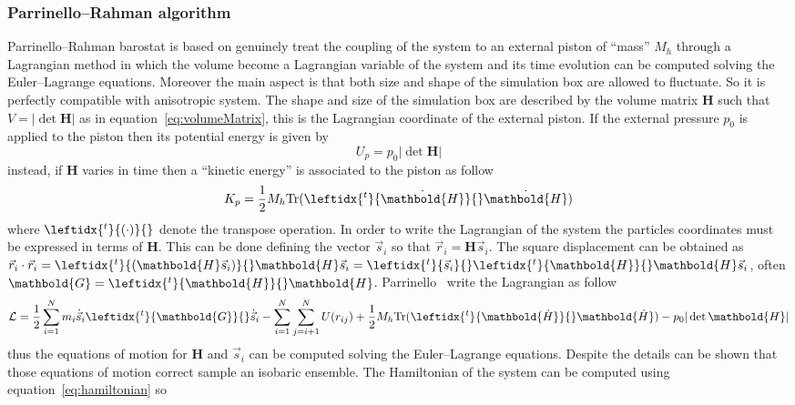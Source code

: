 \subsubsection{Parrinello--Rahman algorithm}
Parrinello--Rahman barostat \cite{ParrinelloBarostat1}\cite{ParrinelloBarostat2} is based on genuinely treat the coupling of the system to an external piston of ``mass'' $M_h$ through a Lagrangian method in which the volume become a Lagrangian variable of the system and its time evolution can be computed solving the Euler--Lagrange equations. Moreover the main aspect is that both size and shape of the simulation box are allowed to fluctuate. So it is perfectly compatible with anisotropic system. The shape and size of the simulation box are described by the volume matrix $ \mathbold{H}$ such that $V = |\det\mathbold{H}|$ as in equation~\eqref{eq:volumeMatrix}, this is the Lagrangian coordinate of the external piston. If the external pressure $p_0$ is applied to the piston then its potential energy is given by
\begin{equation*}
	U_p = p_0 |\det  \mathbold{H}|
\end{equation*}
instead, if $ \mathbold{H}$ varies in time then a ``kinetic energy'' is associated to the piston as follow
\begin{equation*}
	K_p = \frac{1}{2}M_h \text{Tr}(\leftidx{^t}{\dot{ \mathbold{H}}}{} \dot{ \mathbold{H}} )
\end{equation*}
where $\leftidx{^t}{(\cdot)}{}$ denote the transpose operation. In order to write the Lagrangian of the system the particles coordinates must be expressed in terms of $ \mathbold{H}$. This can be done defining the vector $\vec s_i$ so that $\vec r_i =  \mathbold{H} \vec s_i$. The square displacement can be obtained as $\vec r_i \cdot \vec r_i = \leftidx{^t}{ (\mathbold{H} \vec s_i)}{}  \mathbold{H} \vec s_i = \leftidx{^t}{\vec s_i}{} \leftidx{^t}{ \mathbold{H}}{}  \mathbold{H} \vec s_i$, often $ \mathbold{G} = \leftidx{^t}{ \mathbold{H}}{} \mathbold{H}$. Parrinello \etal\, write the Lagrangian as follow
\begin{equation*}
	\mathcal{L} = \frac{1}{2}\sum_{i=1}^N m_i \dot{\vec s}_i \leftidx{^t}{\mathbold{G}}{} \dot{\vec s}_i - \sum_{i=1}^N \sum_{j=i+1}^N U(r_{ij}) +  \frac{1}{2} M_h \text{Tr}(\leftidx{^t}{\mathbold{\dot H}}{} \mathbold{\dot H} ) -  p_0 |\det \mathbold{H}|
\end{equation*}
thus the equations of motion for $ \mathbold{H}$ and $\vec s_i$ can be computed solving the Euler--Lagrange equations. Despite the details can be shown that those equations of motion correct sample an isobaric ensemble. The Hamiltonian of the system can be computed using equation~\eqref{eq:hamiltonian} so
